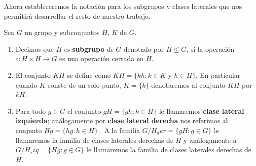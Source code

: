 	Ahora estableceremos la notación para los subgrupos y clases laterales que nos permitirá desarrollar el resto de nuestro trabajo. 	
	
	\begin{df}
	Sea $G$ un grupo y subconjuntos $H$, $K$ de $G$.
	\begin{enumerate}
		\item Decimos que $H$ es \textbf{subgrupo} de $G$ denotado por $H \leq G$, si la operación $\circ:H \times H \to G$ es una operación cerrada en $H$.
		
		\item El conjunto $KH$ se define como  $KH=\{kh: k \in K \text{ y } h \in H \}$. En particular cuando $K$ conste de un solo punto, $K=\{k\}$ denotaremos al conjunto $KH$ por $kH$.	
		
		\item Para todo $g \in G$ el conjunto $gH=\{gh:h \in H \}$ le llamaremos \textbf{clase lateral izquierda}; análogamente por \textbf{clase lateral derecha} nos referimos al conjunto $Hg=\{hg:h \in H\}$ . A la familia  $G/H_der=\{gH:g \in G\}$
le llamaremos la familia de clases laterales derechas de $H$ y análogamente a $G/H_izq=\{Hg:g \in G\}$
le llamaremos la familia de clases laterales derechas de $H$. 
	\end{enumerate} 
\end{df}	
	
